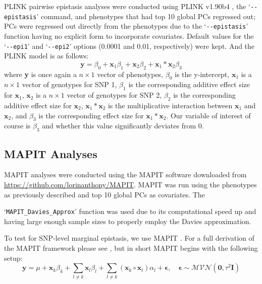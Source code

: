 \documentclass[12pt, a4paper]{article}
\begin{document}
PLINK pairwise epistasis analyses were conducted using PLINK v1.90b4 \citep{Purcell2007}, the `\texttt{-{}-epistasis}' command, and phenotypes that had top 10 global PCs regressed out; PCs were regressed out directly from the phenotypes due to the `\texttt{-{}-epistasis}' function having no explicit form to incorporate covariates. Default values for the `\texttt{-{}-epi1}' and `\texttt{-{}-epi2}' options (0.0001 and 0.01, respectively) were kept. And the PLINK model is as follows:
\begin{equation}
\textbf{y} = \beta_0 + \textbf{x}_1\beta_1 + \textbf{x}_2\beta_2 + \textbf{x}_1*\textbf{x}_2\beta_3    
\end{equation}
where \textbf{y} is once again a $n \times 1$ vector of phenotypes, $\beta_0$ is the y-intercept, $\textbf{x}_1$ is a $n \times 1$ vector of genotypes for SNP 1, $\beta_1$ is the corresponding additive effect size for $\textbf{x}_1$, $\textbf{x}_2$ is a $n \times 1$ vector of genotypes for SNP 2, $\beta_2$ is the corresponding additive effect size for $\textbf{x}_2$, $\textbf{x}_1 * \textbf{x}_2$ is the multiplicative interaction between $\textbf{x}_1$ and $\textbf{x}_2$, and $\beta_3$ is the corresponding effect size for $\textbf{x}_1 * \textbf{x}_2$. Our variable of interest of course is $\beta_3$ and whether this value significantly deviates from 0.  

\subsection{MAPIT Analyses}

MAPIT analyses were conducted using the MAPIT software downloaded from \url{https://github.com/lorinanthony/MAPIT}. MAPIT was run using the phenotypes as previously described and top 10 global PCs as covariates. The 

\noindent `\texttt{MAPIT\_Davies\_Approx}' function was used due to its computational speed up and having large enough sample sizes to properly employ the Davies approximation. 

To test for SNP-level marginal epistasis, we use MAPIT \citep{Crawford2017}. For a full derivation of the MAPIT framework please see \citet{Crawford2017}, but in short MAPIT begins with the following setup:
\begin{equation}
\textbf{y} = \mu + \textbf{x}_k\beta_k + \sum_{l \neq k} \textbf{x}_l\beta_l + \sum_{l \neq k} (\textbf{x}_k \circ \textbf{x}_l)\alpha_l + \boldsymbol{\epsilon}, \quad \boldsymbol{\epsilon} \sim \mathcal{MVN}(\textbf{0}, \tau^{2}\textbf{I})  
\end{equation}
\end{document}
